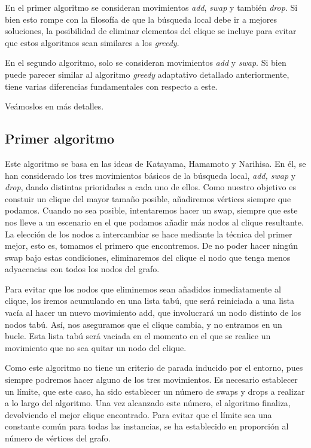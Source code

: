En el primer algoritmo se consideran movimientos \textit{add}, \textit{swap} y también \textit{drop}.
Si bien esto rompe con la filosofía de que la búsqueda local debe ir a mejores soluciones, la posibilidad de
eliminar elementos del clique se incluye para evitar que estos algoritmos sean similares a los
\textit{greedy}.

En el segundo algoritmo, solo se consideran movimientos \textit{add} y \textit{swap}. Si bien puede
parecer similar al algoritmo \textit{greedy} adaptativo detallado anteriormente, tiene varias diferencias
fundamentales con respecto a este.

Veámoslos en más detalles.

\subsection{Primer algoritmo}

Este algoritmo se basa en las ideas de Katayama, Hamamoto y Narihisa. En él, se han considerado
los tres movimientos básicos de la búsqueda local, \textit{add, swap} y \textit{drop},
dando distintas prioridades a cada uno de ellos. Como nuestro objetivo es constuir un clique del
mayor tamaño posible, añadiremos vértices siempre que podamos. Cuando no sea posible, intentaremos
hacer un swap, siempre que este nos lleve a un escenario en el que podamos añadir más nodos
al clique resultante. La elección de los nodos a intercambiar se hace mediante la técnica del
primer mejor, esto es, tomamos el primero que encontremos. De no poder hacer ningún swap bajo
estas condiciones, eliminaremos del clique el nodo que tenga menos adyacencias con todos los nodos del grafo.

Para evitar que los nodos que eliminemos sean añadidos inmediatamente al clique,
los iremos acumulando en una lista tabú, que será reiniciada a una lista vacía al hacer
un nuevo movimiento add, que involucrará un nodo distinto de los nodos tabú. Así, nos aseguramos
que el clique cambia, y no entramos en un bucle. Esta lista tabú será vaciada en el momento en el
que se realice un movimiento que no sea quitar un nodo del clique.

Como este algoritmo no tiene un criterio de parada inducido por el entorno, pues siempre podremos
hacer alguno de los tres movimientos. Es necesario establecer un límite, que este caso, ha
sido establecer un número de swaps y drops a realizar a lo largo del algoritmo. Una vez alcanzado
este número, el algoritmo finaliza, devolviendo el mejor clique encontrado.
Para evitar que el límite sea una constante común para todas las instancias, se ha establecido en proporción
al número de vértices del grafo.

